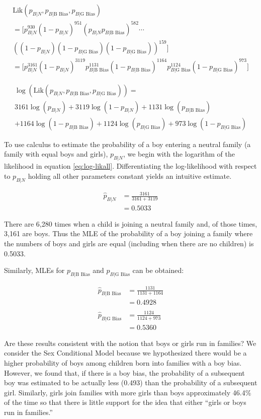 \documentclass[
]{krantz}
\newcommand{\Lik}{\mathrm{Lik}}
\newcommand{\neutral}{p_{B|N}}
\newcommand{\gbias}{p_{B|\textrm{G Bias}}}
\newcommand{\bbias}{p_{B|\textrm{B Bias}}}
\begin{document}
\begin{multline*}
 \Lik(\neutral,  \bbias, \gbias) \\
 = \big[ \neutral^{930}(1-\neutral)^{951} ( \neutral\bbias)^{582} \cdots  \\
 ((1-\neutral)(1-\gbias)(1-\gbias))^{159} \big] \\ 
 = \big[\neutral^{3161}(1-\neutral)^{3119}\bbias^{1131} (1-\bbias)^{1164}\gbias^{1124}(1-\gbias)^{973} \big]
\end{multline*}

\begin{multline}
\log(\Lik(\neutral,  \bbias, \gbias)) = \\  
 3161\log(\neutral)+3119\log(1-\neutral)+1131\log(\bbias) \\
 +1164\log(1-\bbias)+1124\log(\gbias)+ 973\log(1-\gbias)
\label{eq:log-likall} 
\end{multline}

To use calculus to estimate the probability of a boy entering a neutral family (a family with equal boys and girls), \(\neutral\), we begin with the logarithm of the likelihood in equation \eqref{eq:log-likall}. Differentiating the log-likelihood with respect to \(\neutral\) holding all other parameters constant yields an intuitive estimate.

\begin{align*}
 \hat{p}_{B|N}&=\frac{3161}{3161+3119} \\
 &=0.5033
\end{align*}

There are 6,280 times when a child is joining a neutral family and, of those times, 3,161 are boys. Thus the MLE of the probability of a boy joining a family where the numbers of boys and girls are equal (including when there are no children) is 0.5033.

Similarly, MLEs for \(\bbias\) and \(\gbias\) can be obtained:

\begin{align*}
 \hat{p}_{B|\textrm{B Bias}}&= \frac{1131}{1131+1164}\\
 & =  0.4928 \\
 &  \\
 \hat{p}_{B|\textrm{G Bias}}&=\frac{1124}{1124+973}\\
&= 0.5360
\end{align*}

Are these results consistent with the notion that boys or girls run in families? We consider the Sex Conditional Model because we hypothesized there would be a higher probability of boys among children born into families with a boy bias. However, we found that, if there is a boy bias, the probability of a subsequent boy was estimated to be actually less (0.493) than the probability of a subsequent girl. Similarly, girls join families with more girls than boys approximately 46.4\% of the time so that there is little support for the idea that either ``girls or boys run in families.''
\end{document}

